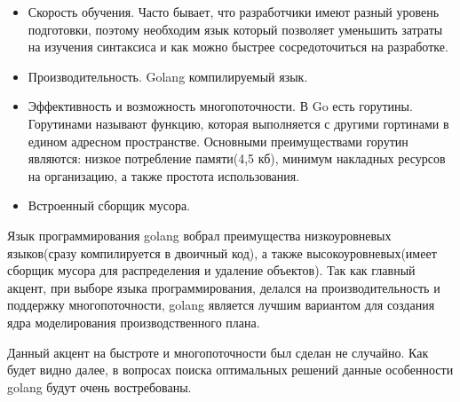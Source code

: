 \begin{itemize}
    \item Скорость обучения. Часто бывает, что разработчики имеют разный уровень подготовки, поэтому необходим язык который позволяет уменьшить затраты на изучения синтаксиса и как можно быстрее сосредоточиться на разработке. 
    \item Производительность. Golang компилируемый язык. 
    \item Эффективность и возможность многопоточности. В Go есть горутины. Горутинами называют функцию, которая выполняется с другими гортинами в едином адресном пространстве. Основными преимуществами горутин являются: низкое потребление памяти(4,5 кб), минимум накладных ресурсов на организацию, а также простота использования.
    \item Встроенный сборщик мусора.
\end{itemize}

Язык программирования golang вобрал преимущества низкоуровневых языков(сразу компилируется в двоичный код), а также высокоуровневых(имеет сборщик мусора для распределения и удаление объектов). Так как главный акцент, при выборе языка программирования, делался на производительность и поддержку многопоточности, golang является лучшим вариантом для создания ядра моделирования производственного плана. 

Данный акцент на быстроте и многопоточности был сделан не случайно. Как будет видно далее, в вопросах поиска оптимальных решений данные особенности golang будут очень востребованы.